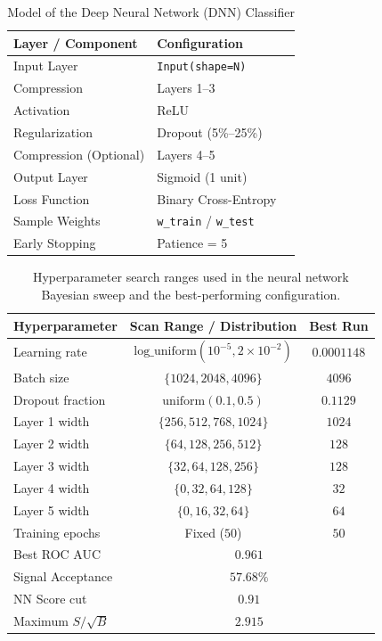 \begin{table}[htbp]
\centering
\caption{Model of the Deep Neural Network (DNN) Classifier}
\label{tab:nn_model}
\begin{tabular}{@{}lll@{}}
\toprule                                                                    
\textbf{Layer / Component} & \textbf{Configuration}  \\ \midrule
Input Layer & \texttt{Input(shape=N)} \\
Compression & Layers 1--3 \\
Activation & ReLU  \\
Regularization & Dropout (5\%--25\%)  \\
Compression (Optional) & Layers 4--5 \\
Output Layer & Sigmoid (1 unit)  \\
Loss Function & Binary Cross-Entropy  \\
Sample Weights & \texttt{w\_train} / \texttt{w\_test}  \\
Early Stopping & Patience = 5 \\ \bottomrule
\end{tabular}
\end{table}


\begin{table}[htbp]
\centering
\caption{Hyperparameter search ranges used in the neural network Bayesian sweep and the best-performing configuration.}
\label{tab:nn_sweep}
\begin{tabular}{lcc}
\hline
\textbf{Hyperparameter} & \textbf{Scan Range / Distribution} & \textbf{Best Run} \\
\hline
Learning rate & $\mathrm{log\_uniform}(10^{-5}, 2\times 10^{-2})$ & $0.0001148$ \\
Batch size & $\{1024, 2048, 4096\}$ & $4096$ \\
Dropout fraction & $\mathrm{uniform}(0.1, 0.5)$ & $0.1129$ \\
Layer 1 width & $\{256, 512, 768, 1024\}$ & $1024$ \\
Layer 2 width & $\{64, 128, 256, 512\}$ & $128$ \\
Layer 3 width & $\{32, 64, 128, 256\}$ & $128$ \\
Layer 4 width & $\{0, 32, 64, 128\}$ & $32$ \\
Layer 5 width & $\{0, 16, 32, 64\}$ & $64$ \\
Training epochs & Fixed ($50$) & $50$ \\
\hline
Best ROC AUC & \multicolumn{2}{c}{$0.961$} \\
Signal Acceptance & \multicolumn{2}{c}{$57.68\%$} \\
NN Score cut & \multicolumn{2}{c}{$0.91$} \\
Maximum $S/\sqrt{B}$ & \multicolumn{2}{c}{$2.915$} \\
\hline
\end{tabular}
\end{table}

